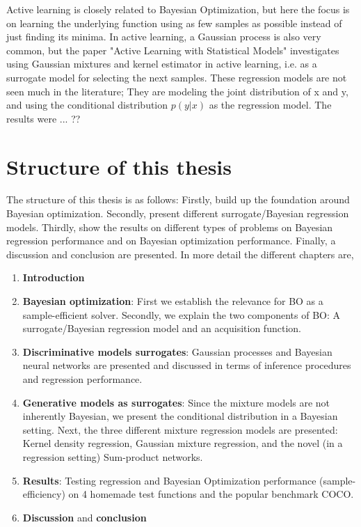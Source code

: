 Active learning is closely related to Bayesian Optimization, but here the focus is on learning the
underlying function using as few samples as possible instead of just finding its minima. In active
learning, a Gaussian process is also very common, but the paper "Active Learning with Statistical
Models" \cite{ALStatisticalModels} investigates using Gaussian mixtures and kernel estimator in
active learning, i.e. as a surrogate model for selecting the next samples. These regression
models are not seen much in the literature; They are modeling the joint distribution of x and y, and
using the conditional distribution $p(y|x)$ as the regression model. The results were ... ??

\section{Structure of this thesis}
The structure of this thesis is as follows: Firstly, build up the foundation around Bayesian
optimization. Secondly, present different surrogate/Bayesian regression models. Thirdly, show the
results on different types of problems on Bayesian regression performance and on Bayesian
optimization performance. Finally, a discussion and conclusion are presented. In more detail the different
chapters are, 

\begin{enumerate}[noitemsep]
    \item \textbf{Introduction}
    \item \textbf{Bayesian optimization}: First we establish the relevance for BO as a
    sample-efficient solver. Secondly, we explain the two components of BO: A 
    surrogate/Bayesian regression model and an acquisition function.
    \item \textbf{Discriminative models surrogates}: Gaussian processes and Bayesian neural
    networks are presented and discussed in terms of inference procedures and regression performance. 
    \item \textbf{Generative models as surrogates}: Since the mixture models are not 
    inherently Bayesian, we present the conditional distribution in a Bayesian setting. 
    Next, the three different mixture regression models are presented: Kernel density regression, Gaussian mixture regression,
    and the novel (in a regression setting) Sum-product networks.
    \item \textbf{Results}: Testing regression and Bayesian Optimization performance
    (sample-efficiency) on 4 homemade test functions and the popular benchmark COCO.
    \item \textbf{Discussion} and \textbf{conclusion}
\end{enumerate}

